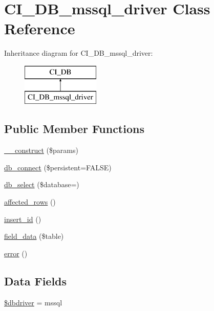 \hypertarget{class_c_i___d_b__mssql__driver}{}\section{C\+I\+\_\+\+D\+B\+\_\+mssql\+\_\+driver Class Reference}
\label{class_c_i___d_b__mssql__driver}
Inheritance diagram for C\+I\+\_\+\+D\+B\+\_\+mssql\+\_\+driver\+:\begin{figure}[H]
\begin{center}
\leavevmode
\includegraphics[height=2.000000cm]{class_c_i___d_b__mssql__driver}
\end{center}
\end{figure}
\subsection*{Public Member Functions}
\begin{DoxyCompactItemize}
\item 
\mbox{\hyperlink{class_c_i___d_b__mssql__driver_a9162320adff1a1a4afd7f2372f753a3e}{\+\_\+\+\_\+construct}} (\$params)
\item 
\mbox{\hyperlink{class_c_i___d_b__mssql__driver_a52bf595e79e96cc0a7c907a9b45aeb4d}{db\+\_\+connect}} (\$persistent=F\+A\+L\+SE)
\item 
\mbox{\hyperlink{class_c_i___d_b__mssql__driver_a18ae9c21870b30b45337c5e3626190cc}{db\+\_\+select}} (\$database=\textquotesingle{}\textquotesingle{})
\item 
\mbox{\hyperlink{class_c_i___d_b__mssql__driver_a77248aaad33eb132c04cc4aa3f4bc8cb}{affected\+\_\+rows}} ()
\item 
\mbox{\hyperlink{class_c_i___d_b__mssql__driver_a933f2cde8dc7f87875e257d0a4902e99}{insert\+\_\+id}} ()
\item 
\mbox{\hyperlink{class_c_i___d_b__mssql__driver_a90355121e1ed009e0efdbd544ab56efa}{field\+\_\+data}} (\$table)
\item 
\mbox{\hyperlink{class_c_i___d_b__mssql__driver_a43b8d30b879d4f09ceb059b02af2bc02}{error}} ()
\end{DoxyCompactItemize}
\subsection*{Data Fields}
\begin{DoxyCompactItemize}
\item 
\mbox{\hyperlink{class_c_i___d_b__mssql__driver_a0cde2a16322a023d040aa7f725877597}{\$dbdriver}} = \textquotesingle{}mssql\textquotesingle{}
\end{DoxyCompactItemize}
